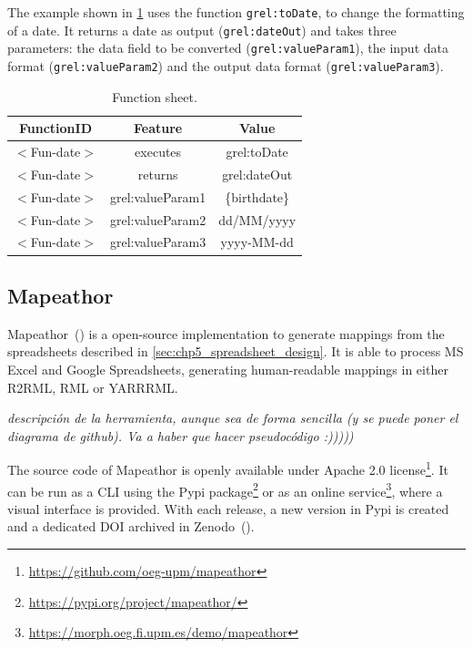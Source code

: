The example shown in \cref{tab:function_sheet} uses the function \texttt{grel:toDate}, to change the formatting of a date. It returns a date as output (\texttt{grel:dateOut}) and takes three parameters: the data field to be converted (\texttt{grel:valueParam1}), the input data format (\texttt{grel:valueParam2}) and the output data format (\texttt{grel:valueParam3}).

\begin{table}[h!]
\caption{Function sheet.}
\label{tab:function_sheet}
\centering
\begin{tabular}{c|c|c}
\midrule
\textbf{FunctionID} & \textbf{Feature} & \textbf{Value} \\ \midrule
$<$Fun-date$>$ & executes & grel:toDate \\  
$<$Fun-date$>$ & returns & grel:dateOut \\  
$<$Fun-date$>$ & grel:valueParam1 & \{birthdate\} \\
$<$Fun-date$>$ & grel:valueParam2 & dd/MM/yyyy \\
$<$Fun-date$>$ & grel:valueParam3 & yyyy-MM-dd \\
\midrule
\end{tabular}
\end{table}


\subsection{Mapeathor}
\label{sec:chp5_mapeathor_tool}

Mapeathor~(\cite{iglesias-molina_2023_5973906}) is a open-source implementation to generate mappings from the spreadsheets described in \cref{sec:chp5_spreadsheet_design}. It is able to process MS Excel and Google Spreadsheets, generating human-readable mappings in either R2RML, RML or YARRRML. 

\textit{descripción de la herramienta, aunque sea de forma sencilla (y se puede poner el diagrama de github). Va a haber que hacer pseudocódigo :)))))}

The source code of Mapeathor is openly available under Apache 2.0 license\footnote{\url{https://github.com/oeg-upm/mapeathor}}. It can be run as a CLI using the Pypi package\footnote{\url{https://pypi.org/project/mapeathor/}} or as an online service\footnote{\url{https://morph.oeg.fi.upm.es/demo/mapeathor}}, where a visual interface is provided. With each release, a new version in Pypi is created and a dedicated DOI archived in Zenodo~(\cite{iglesias-molina_2023_5973906}). 


